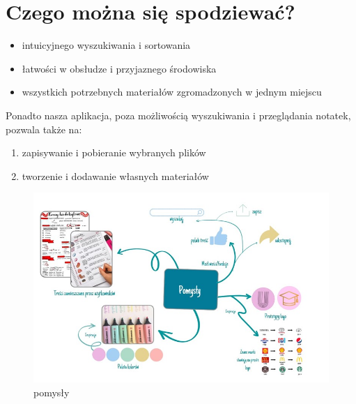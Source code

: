 
\section{Czego można się spodziewać?}

\begin{itemize}
  \item intuicyjnego wyszukiwania i sortowania
  \item łatwości w obsłudze i przyjaznego środowiska 
  \item wszystkich potrzebnych materiałów zgromadzonych w jednym miejscu
\end{itemize}

\noindent Ponadto nasza aplikacja, poza możliwością wyszukiwania i przeglądania notatek, pozwala także na:

\begin{enumerate}
  \item zapisywanie i pobieranie wybranych plików
  \item tworzenie i dodawanie własnych materiałów
\end{enumerate}

\begin{figure}[htbp]
    \centering
    \includegraphics[width=1.0\textwidth]{pictures/Pomysly.jpg}
    \caption{pomysły}
    \label{fig:pomysły}
\end{figure}
